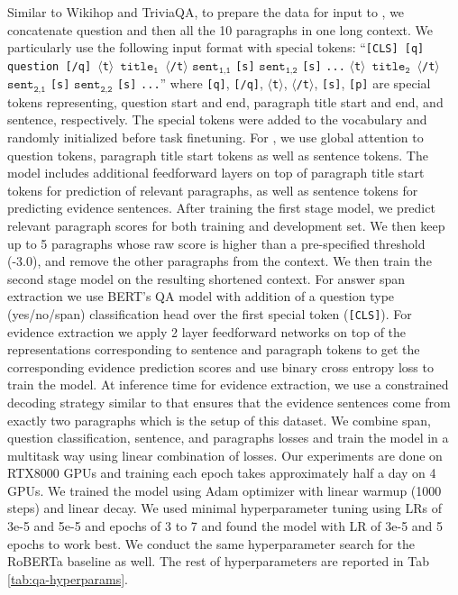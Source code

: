 Similar to Wikihop and TriviaQA, to prepare the data for input to \model, we concatenate question and then all the 10 paragraphs in one long context. We particularly use the following input format with special tokens: ``\texttt{[CLS] [q] question [/q] $\langle$t$\rangle$ $\texttt{title}_{\texttt{1}}$ $\langle$/t$\rangle$} $\texttt{sent}_{\texttt{1,1}}$ \texttt{[s]} $\texttt{sent}_{\texttt{1,2}}$ \texttt{[s]} \texttt{...} \texttt{$\langle$t$\rangle$ $\texttt{title}_{\texttt{2}}$ $\langle$/t$\rangle$ }  $\texttt{sent}_{\texttt{2,1}}$ \texttt{[s]} $\texttt{sent}_{\texttt{2,2}}$ \texttt{[s]} \texttt{...}'' where \texttt{[q]}, \texttt{[/q]}, $\langle$\texttt{t}$\rangle$, $\langle$\texttt{/t}$\rangle$, \texttt{[s]}, \texttt{[p]} are special tokens representing, question start and end, paragraph title start and end, and sentence, respectively. The special tokens were added to the \model vocabulary and randomly initialized before task finetuning. For \model, we use global attention to question tokens, paragraph title start tokens as well as sentence tokens. The model includes additional feedforward layers on top of paragraph title start tokens for prediction of relevant paragraphs, as well as sentence tokens for predicting evidence sentences. After training the first stage model, we predict relevant paragraph scores for both training and development set. We then keep up to 5 paragraphs whose raw score is higher than a pre-specified threshold (-3.0), and remove the other paragraphs from the context. We then train the second stage model on the resulting shortened context. For answer span extraction we use BERT's QA model \cite{bert} with addition of a question type (yes/no/span) classification head over the first special token (\texttt{[CLS]}). For evidence extraction we apply 2 layer feedforward networks on top of the representations corresponding to sentence and paragraph tokens to get the corresponding evidence prediction scores and use binary cross entropy loss to train the model. At inference time for evidence extraction, we use a constrained decoding strategy similar to \citet{quark2020} that ensures that the evidence sentences come from exactly two paragraphs which is the setup of this dataset. We combine span, question classification, sentence, and paragraphs losses and train the model in a multitask way using linear combination of losses. Our experiments are done on RTX8000 GPUs and training each epoch takes approximately half a day on 4 GPUs.
We trained the model using Adam optimizer with linear warmup (1000 steps) and linear decay. We used minimal hyperparameter tuning using LRs of 3e-5 and 5e-5 and epochs of 3 to 7 and found the model with LR of 3e-5 and 5 epochs to work best. We conduct the same hyperparameter search for the RoBERTa baseline as well. The rest of hyperparameters are reported in Tab \ref{tab:qa-hyperparams}. 

